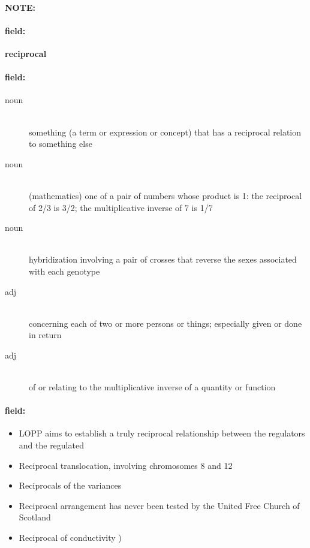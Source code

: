 \documentclass[12pt]{article}
\newenvironment{note}{\paragraph{NOTE:}}{}
\newenvironment{field}{\paragraph{field:}}{}
\begin{document}
\begin{note}
\begin{field}
\textbf{\large reciprocal}
\end{field}


\begin{field}
\begin{description}
\item[noun] \hfill \\ 
something (a term or expression or concept) that has a reciprocal relation to something else

\item[noun] \hfill \\ 
(mathematics) one of a pair of numbers whose product is 1: the reciprocal of 2/3 is 3/2; the multiplicative inverse of 7 is 1/7

\item[noun] \hfill \\ 
hybridization involving a pair of crosses that reverse the sexes associated with each genotype

\item[adj] \hfill \\ 
concerning each of two or more persons or things; especially given or done in return

\item[adj] \hfill \\ 
of or relating to the multiplicative inverse of a quantity or function

\end{description}
\end{field}

\begin{field}
\begin{itemize}
\item LOPP aims to establish a truly reciprocal relationship between the regulators and the regulated
\item Reciprocal translocation, involving chromosomes 8 and 12
\item Reciprocals of the variances
\item Reciprocal arrangement has never been tested by the United Free Church of Scotland
\item Reciprocal of conductivity )
\end{itemize}
\end{field}
\end{note}
\end{document}
